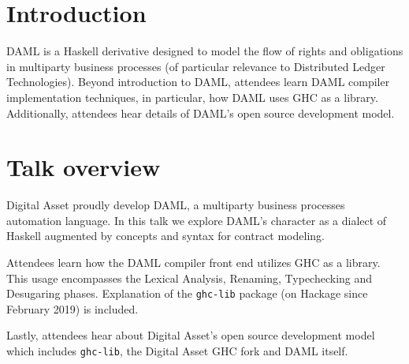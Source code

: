 \documentclass[acmsmall]{acmart}
\begin{document}
%
\maketitle

\section{Introduction}
DAML is a Haskell derivative designed to model the flow of rights and obligations in multiparty business processes (of particular relevance to Distributed Ledger Technologies). Beyond introduction to DAML, attendees learn DAML compiler implementation techniques, in particular, how DAML uses GHC as a library. Additionally, attendees hear details of DAML's open source development model.

\section{Talk overview}
Digital Asset proudly develop DAML, a multiparty business processes automation language. In this talk we explore DAML's character as a dialect of Haskell augmented by concepts and syntax for contract modeling.

Attendees learn how the DAML compiler front end utilizes GHC as a library. This usage encompasses the Lexical Analysis, Renaming, Typechecking and Desugaring phases. Explanation of the \verb|ghc-lib| package (on Hackage since February 2019) is included.

Lastly, attendees hear about Digital Asset's open source development model which includes \verb|ghc-lib|, the Digital Asset GHC fork and DAML itself.
\end{document}
